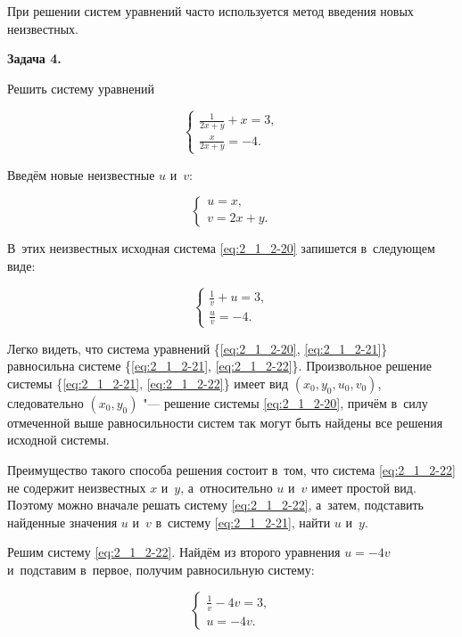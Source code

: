 При решении систем уравнений часто используется метод введения новых неизвестных.

\hypertarget{ex:2_1_2_4}{\textbf{Задача 4.}} Решить систему уравнений

\begin{equation}\label{eq:2_1_2-20}
\begin{cases}
\displaystyle \frac{1}{2x + y} + x = 3, \\[10pt]
\displaystyle \frac{x}{2x + y} = -4.
\end{cases}
\end{equation} 

Введём новые неизвестные $u$ и~$v$:

\begin{equation}\label{eq:2_1_2-21}
\begin{cases}
u = x, \\
v = 2x + y.
\end{cases}
\end{equation}

В~этих неизвестных исходная система \eqref{eq:2_1_2-20} запишется в~следующем виде:

\begin{equation}\label{eq:2_1_2-22}
\begin{cases}
\displaystyle \frac{1}{v} + u = 3, \\[10pt]
\displaystyle \frac{u}{v} = -4.
\end{cases}
\end{equation}

Легко видеть, что система уравнений \{\eqref{eq:2_1_2-20}, \eqref{eq:2_1_2-21}\}
равносильна системе \{\eqref{eq:2_1_2-21}, \eqref{eq:2_1_2-22}\}.
Произвольное решение системы \{\eqref{eq:2_1_2-21}, \eqref{eq:2_1_2-22}\}
имеет вид $(x_{0}, y_{0}, u_{0}, v_{0})$, следовательно
$(x_{0}, y_{0})$ "--- решение системы \eqref{eq:2_1_2-20}, причём в~силу отмеченной
выше равносильности систем так могут быть найдены все решения исходной системы.

Преимущество такого способа решения состоит в~том, что система \eqref{eq:2_1_2-22}
не содержит неизвестных $x$ и~$y$, а~относительно $u$ и~$v$ имеет простой вид.
Поэтому можно вначале решать систему \eqref{eq:2_1_2-22}, а~затем, подставить
найденные значения $u$ и~$v$ в~систему \eqref{eq:2_1_2-21}, найти $u$ и~$y$.

Решим систему \eqref{eq:2_1_2-22}. Найдём из второго уравнения $u = -4v$
и~подставим в~первое, получим равносильную систему:

\begin{equation*}
\begin{cases}
\displaystyle \frac{1}{v} - 4v = 3, \\
u = -4v.
\end{cases}
\end{equation*}

